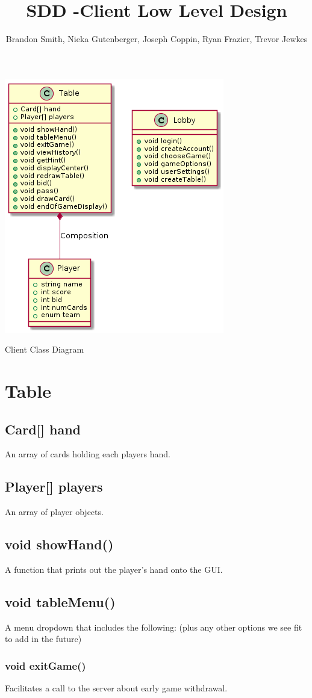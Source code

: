 \documentclass[]{scrartcl}
\title{SDD -Client Low Level Design}
\author{Brandon Smith, Nieka Gutenberger, Joseph Coppin, Ryan Frazier, Trevor Jewkes}
\begin{document}
\maketitle

\centerline{\includegraphics{Client_Class_diagram.png}}
\centerline{Client Class Diagram}

\section{Table}

\subsection{Card[] hand}
	An array of cards holding each players hand.
\subsection{Player[] players}
	An array of player objects.
\subsection{void showHand()}
	A function that prints out the player’s hand onto the GUI.
\subsection{void tableMenu()}
	A menu dropdown that includes the following: (plus any other options we see fit to add in the future)
	\subsubsection{void exitGame()}
		Facilitates a call to the server about early game withdrawal.
\end{document}
